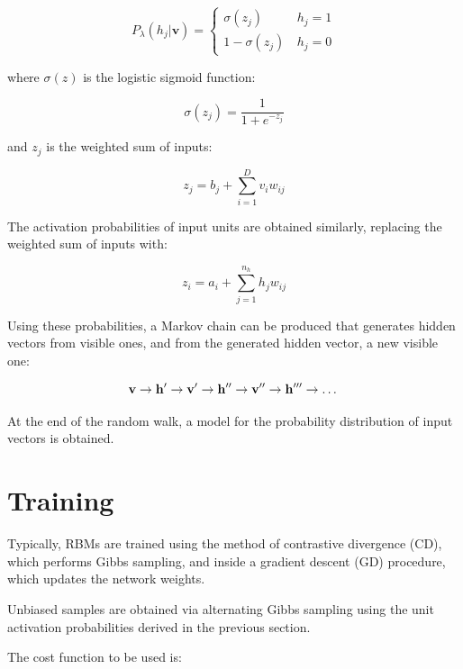 \documentclass[12pt, two sided]{article}
\begin{document}
\begin{equation}
P_{\lambda}(h_j \vert \mathbf{v}) = 
\begin{cases}
\sigma(z_j) &\, h_j = 1\\
1 - \sigma(z_j) &\, h_j = 0
\end{cases}
\end{equation}

where $\sigma(z)$ is the logistic sigmoid function:

\begin{equation}
\sigma(z_j) = \frac{1}{1+e^{-z_j}}
\end{equation}

and $z_j$ is the weighted sum of inputs:

\begin{equation}
z_j = b_j + \sum_{i=1}^{D} v_i w_{ij}
\end{equation}

The activation probabilities of input units are obtained similarly, replacing the weighted sum of inputs with:

\begin{equation}
z_i = a_i + \sum_{j=1}^{n_h} h_j w_{ij}
\end{equation}

Using these probabilities, a Markov chain can be produced that generates hidden vectors from visible ones, and from the generated hidden vector, a new visible one:

\[\bf v \to h^\prime \to v^\prime \to h^{\prime\prime} \to v^{\prime\prime} \to h^{\prime\prime\prime} \to \dots\]

At the end of the random walk, a model for the probability distribution of input vectors is obtained.


\section{Training}

Typically, RBMs are trained using the method of contrastive divergence (CD), which performs Gibbs sampling, and inside a gradient descent (GD) procedure, which updates the network weights.

Unbiased samples are obtained via alternating Gibbs sampling using the unit activation probabilities derived in the previous section.

The cost function to be used is:
\end{document}
